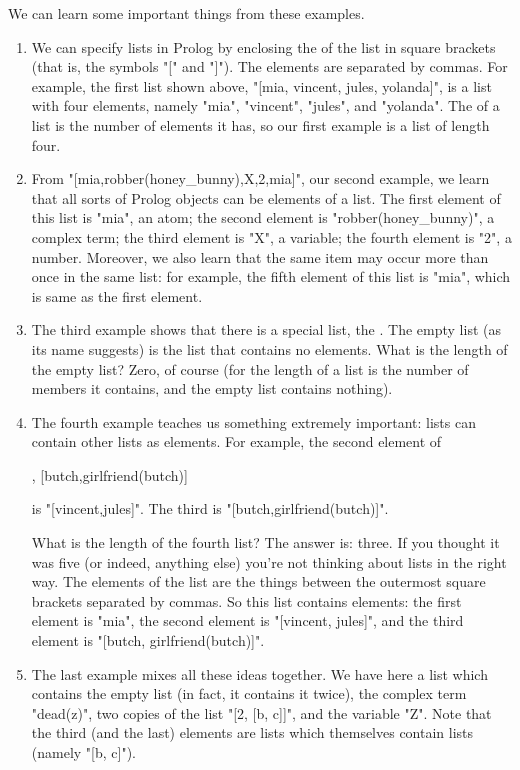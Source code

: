 We can learn some important things from these examples.
\begin{enumerate}
\item{}We can specify lists in Prolog by enclosing the
 of the list in square brackets (that is, the symbols
"[" and "]").  The elements are separated by commas.  For example, the
first list shown above, "[mia, vincent, jules, yolanda]", is a list with
four elements, namely "mia", "vincent", "jules", and "yolanda".  The
 of a list is the number of elements it has, so our
first example is a list of length four.
\item{}From "[mia,robber(honey_bunny),X,2,mia]",
our second example,
we learn that all sorts of Prolog
objects can be elements of a list.  The first element of this list is
"mia", an atom; the second element is "robber(honey_bunny)",
a complex term; the third element is "X", a variable; the fourth
element is "2", a number.  Moreover, we also learn that the same
item may occur more than once in the same list: for example, the fifth
element of this list is "mia", which is same as the first
element.
\item{}The third example shows that there is a special list,
        the .  The empty list (as its name
        suggests) is the list that contains no elements.  What is the
        length of the empty list?  Zero, of course (for the length of a
        list is the number of members it contains, and the empty list
        contains nothing).
\item{}The fourth example teaches us something extremely important:
        lists can contain other lists as elements.  For example, the
        second element of
        \begin{LPNcodedisplay}
[mia, [vincent, jules], [butch,girlfriend(butch)]
\end{LPNcodedisplay}
 is
        "[vincent,jules]". The
        third is "[butch,girlfriend(butch)]".

        What is the length of the fourth list?  The answer is: three.
If you thought it was five (or indeed, anything else) you're not
thinking about lists in the right way.  The elements of the list are
the things between the outermost square brackets separated by commas.
So this list contains  elements: the first element is
"mia", the second element is "[vincent, jules]", and the
third element is "[butch, girlfriend(butch)]".
\item{}The last example mixes all these ideas together.  We have
        here a list which contains the empty list (in fact, it contains it
        twice), the complex term "dead(z)", two copies of the list
        "[2, [b, c]]", and the variable "Z".  Note that
        the third (and the last) elements are lists which themselves
        contain lists (namely "[b, c]").
\end{enumerate}


